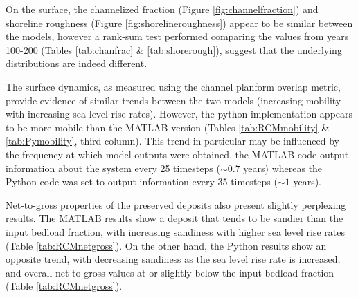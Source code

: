 \documentclass[a4paper]{article}
\begin{document}
On the surface, the channelized fraction (Figure \ref{fig:channelfraction}) and shoreline roughness (Figure \ref{fig:shorelineroughness}) appear to be similar between the models, however a rank-sum test performed comparing the values from years 100-200 (Tables \ref{tab:chanfrac} \& \ref{tab:shorerough}), suggest that the underlying distributions are indeed different.

The surface dynamics, as measured using the channel planform overlap metric, provide evidence of similar trends between the two models (increasing mobility with increasing sea level rise rates).
However, the python implementation appears to be more mobile than the MATLAB version (Tables \ref{tab:RCMmobility} \& \ref{tab:Pymobility}, third column).
This trend in particular may be influenced by the frequency at which model outputs were obtained, the MATLAB code output information about the system every 25 timesteps ($\sim0.7$ years) whereas the Python code was set to output information every 35 timesteps ($\sim1$ years).

Net-to-gross properties of the preserved deposits also present slightly perplexing results.
The MATLAB results show a deposit that tends to be sandier than the input bedload fraction, with increasing sandiness with higher sea level rise rates (Table \ref{tab:RCMnetgross}).
On the other hand, the Python results show an opposite trend, with decreasing sandiness as the sea level rise rate is increased, and overall net-to-gross values at or slightly below the input bedload fraction (Table \ref{tab:RCMnetgross}).

\clearpage
\end{document}
